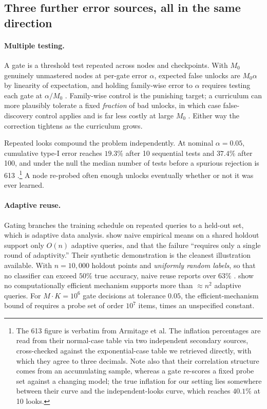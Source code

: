 \documentclass[11pt]{article}
\theoremstyle{plain}
\theoremstyle{definition}
\theoremstyle{remark}
\begin{document}
\subsection{Three further error sources, all in the same direction}

\paragraph{Multiple testing.} A gate is a threshold test repeated across nodes
and checkpoints. With $M_0$ genuinely unmastered nodes at per-gate error
$\alpha$, expected false unlocks are $M_0\alpha$ by linearity of expectation, and
holding family-wise error to $\alpha$ requires testing each gate at $\alpha/M_0$
\citep{dunn1961multiple}. Family-wise control is the punishing target; a
curriculum can more plausibly tolerate a fixed \emph{fraction} of bad unlocks, in
which case false-discovery control applies and is far less costly at large $M_0$
\citep{benjamini1995controlling}. Either way the correction tightens as the
curriculum grows.

Repeated looks compound the problem independently. At nominal $\alpha = 0.05$,
cumulative type-I error reaches $19.3\%$ after 10 sequential tests and $37.4\%$
after 100, and under the null the median number of tests before a spurious
rejection is 613 \citep{armitage1969repeated}.\footnote{The 613 figure is
verbatim from Armitage et al. The inflation percentages are read from their
normal-case table via two independent secondary sources, cross-checked against
the exponential-case table we retrieved directly, with which they agree to three
decimals. Note also that their correlation structure comes from an accumulating
sample, whereas a gate re-scores a fixed probe set against a changing model; the
true inflation for our setting lies somewhere between their curve and the
independent-looks curve, which reaches $40.1\%$ at 10 looks.} A node re-probed
often enough unlocks eventually whether or not it was ever learned.

\paragraph{Adaptive reuse.} Gating branches the training schedule on repeated
queries to a held-out set, which is adaptive data analysis.
\citet{dwork2015preserving} show naive empirical means on a shared holdout
support only $O(n)$ adaptive queries, and that the failure ``requires only a
single round of adaptivity.'' Their synthetic demonstration is the cleanest
illustration available. With $n = 10{,}000$ holdout points and \emph{uniformly
random labels}, so that no classifier can exceed $50\%$ true accuracy, naive
reuse reports over $63\%$ \citep{dwork2015reusable}. \citet{steinke2015interactive}
show no computationally efficient mechanism supports more than ${\approx}n^2$
adaptive queries. For $M \cdot K = 10^6$ gate decisions at tolerance $0.05$, the
efficient-mechanism bound of \citet{dwork2015preserving} requires a probe set of
order $10^7$ items, times an unspecified constant.
\end{document}

